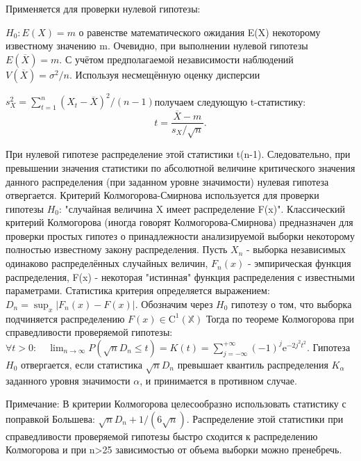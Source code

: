 \documentclass[a4paper, 12pt]{article}
\begin{document}
	Применяется для проверки нулевой гипотезы:
	
	$H_{0}:E(X)=m$ о равенстве математического ожидания 
	E(X) некоторому известному значению 
	m.
	Очевидно, при выполнении нулевой гипотезы 
	$E(\overline {X})=m.$ С учётом предполагаемой независимости наблюдений 	$V(\overline{X})=\sigma ^{2}/n$. Используя несмещённую оценку дисперсии 
	
	$s_{X}^{2}=\sum _{{t=1}}^{n}(X_{t}-\overline {X})^{2}/(n-1) $получаем следующую t-статистику:
	$$ t={\frac {{\overline {X}}-m}{s_{X}/{\sqrt {n}}}}.$$
	
	При нулевой гипотезе распределение этой статистики 
	t(n-1). Следовательно, при превышении значения статистики по абсолютной величине критического значения данного распределения (при заданном уровне значимости) нулевая гипотеза отвергается.
	Критерий Колмогорова-Смирнова используется для проверки гипотезы $H_0$: "случайная величина X имеет распределение F(x)".
	Классический критерий Колмогорова (иногда говорят Колмогорова-Смирнова) предназначен для проверки простых гипотез о принадлежности анализируемой выборки некоторому полностью известному закону распределения.
	Пусть $X_n$ - выборка независимых одинаково распределённых случайных величин, $F_n(x)$ - эмпирическая функция распределения, F(x) - некоторая "истинная" функция распределения с известными параметрами. Статистика критерия определяется выражением:
	$D_n=\sup_x |F_n(x)-F(x)|.$
	Обозначим через $H_0$ гипотезу о том, что выборка подчиняется распределению $F(x)\in \mathrm{C}^1(\mathbb{X})$ Тогда по теореме Колмогорова при справедливости проверяемой гипотезы:
	$\forall t>0: \quad \lim_{n \to \infty}P(\sqrt{n} D_n \leq t)=K(t)=\sum_{j=-\infty}^{+\infty}(-1)^j \mathrm{e}^{-2j^2t^2}.$
	Гипотеза $H_0$ отвергается, если статистика $\sqrt{n}D_n\!$ превышает квантиль распределения $K_\alpha$ заданного уровня значимости $\alpha$, и принимается в противном случае.
	
	Примечание: В критерии Колмогорова целесообразно использовать статистику с поправкой Большева: $\sqrt{n}D_n+1/(6\sqrt{n})$. Распределение этой статистики при справедливости проверяемой гипотезы быстро сходится к распределению Колмогорова и при  n>25   зависимостью от объема выборки можно пренебречь.
	
\end{document}
